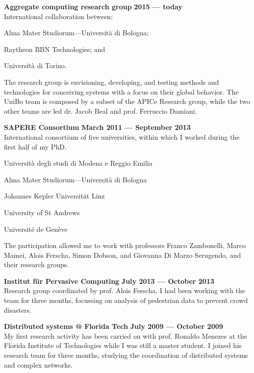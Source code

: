 \halfblankline{}

\textbf{Aggregate computing research group} \hfill \textbf{2015 --- today}\\
International collaboration between:
\begin{innerlist}
    \item Alma Mater Studiorum---Università di Bologna;
    \item Raytheon BBN Technologies; and
    \item Università di Torino.
\end{innerlist}
The research group is envisioning, developing, and testing methods and technologies for conceiving systems with a focus on their global behavior. The UniBo team is composed by a subset of the APICe Research group, while the two other teams are led dr. Jacob Beal and prof. Ferruccio Damiani.

\halfblankline{}

\textbf{SAPERE Consortium} \hfill \textbf{March 2011 --- September 2013}\\
International consortium of five universities, within which I worked during the first half of my PhD.
\begin{innerlist}
    \item Università degli studi di Modena e Reggio Emilia
    \item Alma Mater Studiorum---Università di Bologna
    \item Johannes Kepler Universität Linz
    \item University of St Andrews
    \item Université de Genève
\end{innerlist}
The participation allowed me to work with professors Franco Zambonelli, Marco Mamei, Alois Ferscha, Simon Dobson, and Giovanna Di Marzo Serugendo, and their research groups.

\halfblankline{}

\textbf{Institut für Pervasive Computing} \hfill \textbf{July 2013 --- October 2013}\\
Research group coordinated by prof. Alois Ferscha. I had been working with the team for three months, focussing on analysis of pedestrian data to prevent crowd disasters.

\halfblankline{}

\textbf{Distributed systems @ Florida Tech} \hfill \textbf{July 2009 --- October 2009}\\
My first research activity has been carried on with prof. Ronaldo Menezes at the Florida Institute of Technologies while I was still a master student. I joined his research team for three months, studying the coordination of distributed systems and complex networks.

\halfblankline{}

